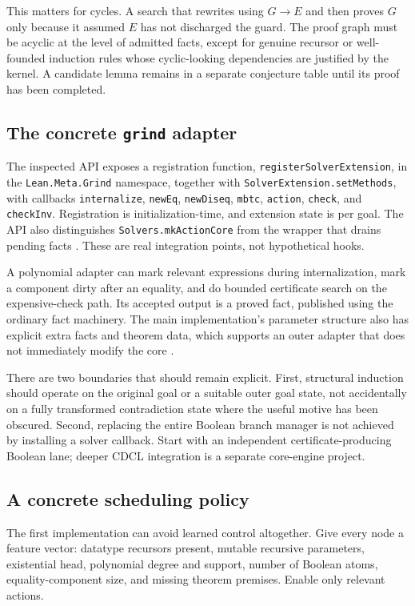 \documentclass[11pt,letterpaper]{article}
\newcommand{\code}[1]{\texttt{#1}}
\theoremstyle{definition}\newtheorem{definition}[theorem]{Definition}
\theoremstyle{remark}\newtheorem{remark}[theorem]{Remark}
\begin{document}
This matters for cycles. A search that rewrites using $G\to E$ and then proves $G$ only because it assumed $E$ has not discharged the guard. The proof graph must be acyclic at the level of admitted facts, except for genuine recursor or well-founded induction rules whose cyclic-looking dependencies are justified by the kernel. A candidate lemma remains in a separate conjecture table until its proof has been completed.

\subsection{The concrete \texttt{grind} adapter}
The inspected API exposes a registration function, \code{registerSolverExtension}, in the \code{Lean.Meta.Grind} namespace, together with \code{SolverExtension.setMethods}, with callbacks \code{internalize}, \code{newEq}, \code{newDiseq}, \code{mbtc}, \code{action}, \code{check}, and \code{checkInv}. Registration is initialization-time, and extension state is per goal. The API also distinguishes \code{Solvers.mkActionCore} from the wrapper that drains pending facts \cite{grindapi}. These are real integration points, not hypothetical hooks.

A polynomial adapter can mark relevant expressions during internalization, mark a component dirty after an equality, and do bounded certificate search on the expensive-check path. Its accepted output is a proved fact, published using the ordinary fact machinery. The main implementation's parameter structure also has explicit extra facts and theorem data, which supports an outer adapter that does not immediately modify the core \cite{grindmain}.

There are two boundaries that should remain explicit. First, structural induction should operate on the original goal or a suitable outer goal state, not accidentally on a fully transformed contradiction state where the useful motive has been obscured. Second, replacing the entire Boolean branch manager is not achieved by installing a solver callback. Start with an independent certificate-producing Boolean lane; deeper CDCL integration is a separate core-engine project.

\subsection{A concrete scheduling policy}
The first implementation can avoid learned control altogether. Give every node a feature vector: datatype recursors present, mutable recursive parameters, existential head, polynomial degree and support, number of Boolean atoms, equality-component size, and missing theorem premises. Enable only relevant actions.
\end{document}
